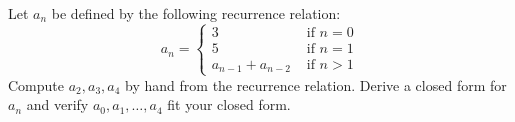 Let $a_n$ be defined by the following recurrence relation:
\[
a_n =
\begin{cases}
3 &\text{ if } n = 0 \\
5 &\text{ if } n = 1 \\
a_{n-1} + a_{n-2} &\text{ if } n > 1
\end{cases}
\]
Compute $a_2, a_3, a_4$ by hand from the recurrence relation.
Derive a closed form for $a_n$ and verify 
$a_0, a_1, \ldots, a_4$ fit your closed form.
